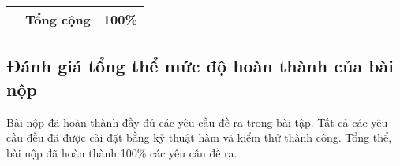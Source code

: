 \begin{center}
\begin{table}[H]
\begin{tabular}{|l|p{}|c|}
                   & \textbf{Tổng cộng}                                       & \textbf{100\%}             \\ \hline
    \end{tabular}
    \label{tab:mytable2}
  \end{table}
\end{center}

\subsection{Đánh giá tổng thể mức độ hoàn thành của bài nộp}

Bài nộp đã hoàn thành đầy đủ các yêu cầu đề ra trong bài tập. Tất cả các yêu cầu đều đã được cài đặt bằng kỹ thuật hàm và kiểm thử thành công. Tổng thể, bài nộp đã hoàn thành 100\% các yêu cầu đề ra.
